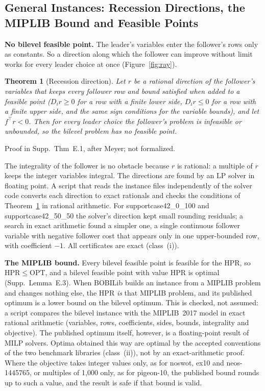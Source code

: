 \documentclass[]{spie}  %
\theoremstyle{plain}
\newtheorem{thm}{Theorem}
\newcommand{\inst}[1]{\mbox{#1}}             %
\newcommand{\OPT}{\mathrm{OPT}}
\newcommand{\HPR}{\mathrm{HPR}}
\newcommand{\T}{^{\top}}
\newcommand{\cls}[1]{class~(#1)}             %
\begin{document}
\subsection{General Instances: Recession Directions, the MIPLIB Bound and Feasible Points}\label{sec:general}

\textbf{No bilevel feasible point.} The leader's variables enter the follower's rows only as
constants. So a direction along which the follower can improve without limit works for every
leader choice at once (Figure~\ref{fig:ray}).

\begin{thm}[Recession direction]\label{thm:ray}
Let $r$ be a rational direction of the follower's variables that keeps every follower row and
bound satisfied when added to a feasible point ($D_ir\ge 0$ for a row with a finite lower side,
$D_ir\le 0$ for a row with a finite upper side, and the same sign conditions for the variable
bounds), and let $f\T r<0$. Then for every leader choice the follower's problem is infeasible or
unbounded, so the bilevel problem has no feasible point.
\end{thm}
\noindent Proof in Supp.\ Thm~E.1, after Meyer;\cite{meyer1974existence} not formalized.

The integrality of the follower is no obstacle because $r$ is rational: a multiple of $r$ keeps
the integer variables integral. The directions are found by an LP solver in floating point. A
script that reads the instance files independently of the solver code converts each direction
to exact rationals and checks the conditions of Theorem~\ref{thm:ray} in rational arithmetic.
For \inst{supportcase42\_0\_100} and \inst{supportcase42\_50\_50} the solver's direction kept small
rounding residuals; a search in exact arithmetic found a simpler one, a single continuous
follower variable with negative follower cost that appears only in one upper-bounded row, with
coefficient $-1$. All \NumRayExact{} certificates are exact (\cls{i}).

\textbf{The MIPLIB bound.} Every bilevel feasible point is feasible for the HPR, so $\HPR\le\OPT$,
and a bilevel feasible point with value $\HPR$ is optimal (Supp.\ Lemma~E.3). When BOBILib
builds an instance from a MIPLIB problem and changes nothing else, the HPR \emph{is} that MIPLIB
problem, and its published optimum\cite{gleixner2021miplib} is a lower bound on the bilevel
optimum. This is checked, not assumed: a script compares the bilevel instance with the
MIPLIB~2017 model in exact rational arithmetic (variables, rows, coefficients, sides, bounds,
integrality and objective). The published optimum itself, however, is a floating-point result of
MILP solvers. Optima obtained this way are optimal by the accepted conventions of the two
benchmark libraries (\cls{ii}), not by an exact-arithmetic proof. Where the objective takes integer
values only, as for \inst{noswot}, \inst{ex10} and \inst{neos-1445765}, or multiples of 1,000 only,
as for \inst{pigeon-10}, the published bound rounds up to such a value, and the result is safe if
that bound is valid.
\end{document}
